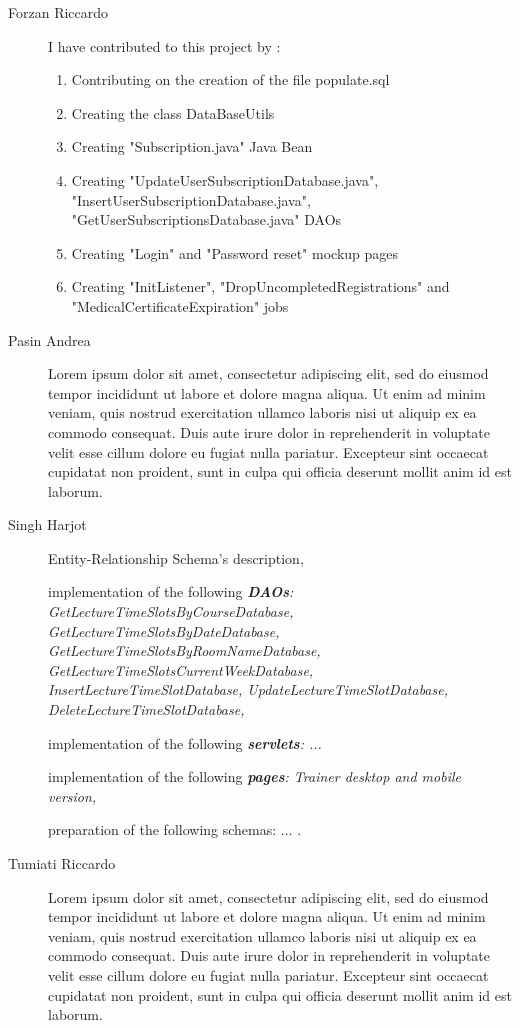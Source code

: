 \begin{description}
	\item[Forzan Riccardo] I have contributed to this project by :
	\begin{enumerate}
		\item Contributing on the creation of the file populate.sql
   		\item Creating the class DataBaseUtils
   		\item Creating "Subscription.java" Java Bean
   		\item Creating "UpdateUserSubscriptionDatabase.java", "InsertUserSubscriptionDatabase.java", "GetUserSubscriptionsDatabase.java" DAOs
   		\item Creating "Login" and "Password reset" mockup pages
   		\item Creating "InitListener", "DropUncompletedRegistrations" and "MedicalCertificateExpiration" jobs
    \end{enumerate}

	\item[Pasin Andrea] Lorem ipsum dolor sit amet, consectetur adipiscing elit, sed do eiusmod tempor incididunt ut labore et dolore magna aliqua. Ut enim ad minim veniam, quis nostrud exercitation ullamco laboris nisi ut aliquip ex ea commodo consequat. Duis aute irure dolor in reprehenderit in voluptate velit esse cillum dolore eu fugiat nulla pariatur. Excepteur sint occaecat cupidatat non proident, sunt in culpa qui officia deserunt mollit anim id est laborum.
	\item[Singh Harjot] Entity-Relationship Schema's description,
	
	implementation of the following \textit{\textbf{DAOs}:
	    GetLectureTimeSlotsByCourseDatabase,
	    GetLectureTimeSlotsByDateDatabase,
	    GetLectureTimeSlotsByRoomNameDatabase,
	    GetLectureTimeSlotsCurrentWeekDatabase,
	    InsertLectureTimeSlotDatabase,
	    UpdateLectureTimeSlotDatabase,
	    DeleteLectureTimeSlotDatabase,
	}
    
	implementation of the following \textit{\textbf{servlets}: 
	    ... 
    }
    
	implementation of the following \textit{\textbf{pages}: 
	    Trainer desktop and mobile version,
    }
    
    preparation of the following schemas: ... .
	\item[Tumiati Riccardo] Lorem ipsum dolor sit amet, consectetur adipiscing elit, sed do eiusmod tempor incididunt ut labore et dolore magna aliqua. Ut enim ad minim veniam, quis nostrud exercitation ullamco laboris nisi ut aliquip ex ea commodo consequat. Duis aute irure dolor in reprehenderit in voluptate velit esse cillum dolore eu fugiat nulla pariatur. Excepteur sint occaecat cupidatat non proident, sunt in culpa qui officia deserunt mollit anim id est laborum.
\end{description}
